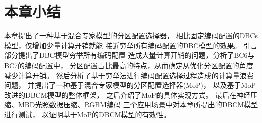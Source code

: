 \section{本章小结}

本章提出了一种基于混合专家模型的分区配置选择器，
相比固定编码配置的DBCs模型，仅增加少量计算开销就能
接近穷举所有编码配置的DBC模型的效果。
引言部分提出了DBC模型穷举所有编码配置
造成大量计算开销的问题，分析了BC6与BC7的编码配置中，
分区配置占比最高的特点，从而确定从优化分区配置的角度减少计算开销。
然后分析了基于穷举法进行编码配置选择过程造成的计算量浪费问题，
并提出了一种基于混合专家模型的分区配置选择器(MoP)，
以及基于MoP改进的DBCM模型的整体框架，
之后介绍了MoP的具体实现方式。
最后在神经压缩、MBD光照数据压缩、RGBM编码
三个应用场景中对本章所提出的DBCM模型进行测试，
以证明基于MoP的DBCM模型的有效性。